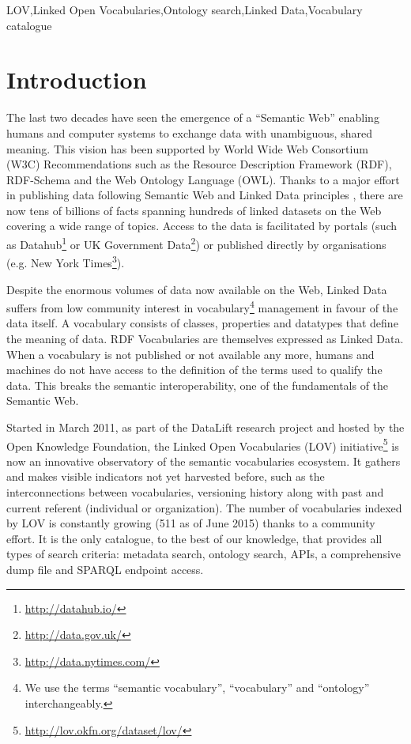 \documentclass{iosart2c}
\begin{document}
\begin{frontmatter}
\begin{keyword}
LOV\sep Linked Open Vocabularies\sep Ontology search\sep Linked Data\sep Vocabulary catalogue
\end{keyword}

\end{frontmatter}


\section{Introduction}
The last two decades have seen the emergence of a ``Semantic Web'' enabling humans and computer systems to exchange data with unambiguous, shared meaning. This vision has been supported by World Wide Web Consortium (W3C) Recommendations such as the Resource Description Framework (RDF), RDF-Schema and the Web Ontology Language (OWL). Thanks to a major effort in publishing data following Semantic Web and Linked Data principles \cite{timld}, there are now tens of billions of facts spanning hundreds of linked datasets on the Web covering a wide range of topics. Access to the data is facilitated by portals (such as Datahub\footnote{\url{http://datahub.io/}} or UK Government Data\footnote{\url{http://data.gov.uk/}}) or published directly by organisations (e.g. New York Times\footnote{\url{http://data.nytimes.com/}}). 

Despite the enormous volumes of data now available on the Web, Linked Data suffers from low community interest in vocabulary\footnote{We use the terms ``semantic vocabulary'', ``vocabulary'' and ``ontology'' interchangeably.} management in favour of the data itself. A vocabulary consists of classes, properties and datatypes that define the meaning of data. RDF Vocabularies are themselves expressed as Linked Data. When a vocabulary is not published or not available any more, humans and machines do not have access to the definition of the terms used to qualify the data. This breaks the semantic interoperability, one of the fundamentals of the Semantic Web. 

Started in March 2011, as part of the DataLift research project \cite{scharffe_2012} and hosted by the Open Knowledge Foundation, the Linked Open Vocabularies (LOV) initiative\footnote{\url{http://lov.okfn.org/dataset/lov/}} is now an innovative observatory of the semantic vocabularies ecosystem. It gathers and makes visible indicators not yet harvested before, such as the interconnections between vocabularies, versioning history along with past and current referent (individual or organization). The number of vocabularies indexed by LOV is constantly growing (511 as of June 2015) thanks to a community effort. It is the only catalogue, to the best of our knowledge, that provides all types of search criteria: metadata search, ontology search, APIs, a comprehensive dump file and SPARQL endpoint access. 
\end{document}
